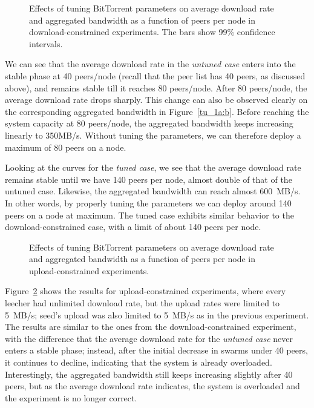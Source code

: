 \documentclass[10pt,letterpaper,twocolumn]{article}
\begin{document}
\begin{figure}[!tb] 
  \centering 
  \caption{Effects of tuning BitTorrent parameters on average download
    rate and aggregated bandwidth as a function of peers per node in
    download-constrained experiments. The bars show 99\% confidence
    intervals.}
  \label{fig:effect-tuning}
\end{figure}

We can see that the average download rate in the \textit{untuned case}
enters into the stable phase at 40 peers/node (recall that the peer
list has 40 peers, as discussed above), and remains stable till it
reaches 80 peers/node. After 80 peers/node, the average download rate
drops sharply. This change can also be observed clearly on the
corresponding aggregated bandwidth in Figure~\ref{tu_1a:b}. Before
reaching the system capacity at 80 peers/node, the aggregated
bandwidth keeps increasing linearly to 350MB/s. Without tuning the
parameters, we can therefore deploy a maximum of 80 peers on a node.

Looking at the curves for the \textit{tuned case}, we see that the
average download rate remains stable until we have 140 peers per node,
almost double of that of the untuned case. Likewise, the aggregated
bandwidth can reach almost 600~MB/s. In other words, by properly
tuning the parameters we can deploy around 140 peers on a node at
maximum. The tuned case exhibits similar behavior to the
download-constrained case, with a limit of about 140 peers per node.

\begin{figure}[!tb] 
  \centering 
  \caption{Effects of tuning BitTorrent parameters on average download
    rate and aggregated bandwidth as a function of peers per node in
    upload-constrained experiments.}
  \label{fig:effect-tuning-upload} 
\end{figure}


Figure~\ref{fig:effect-tuning-upload} shows the results for
upload-constrained experiments, where every leecher had unlimited
download rate, but the upload rates were limited to 5~MB/s; seed's
upload was also limited to 5~MB/s as in the previous experiment. The
results are similar to the ones from the download-constrained
experiment, with the difference that the average download rate for the
\textit{untuned case} never enters a stable phase; instead, after the
initial decrease in swarms under 40 peers, it continues to decline,
indicating that the system is already overloaded. Interestingly, the
aggregated bandwidth still keeps increasing slightly after 40 peers,
but as the average download rate indicates, the system is overloaded
and the experiment is no longer correct.
\end{document}
